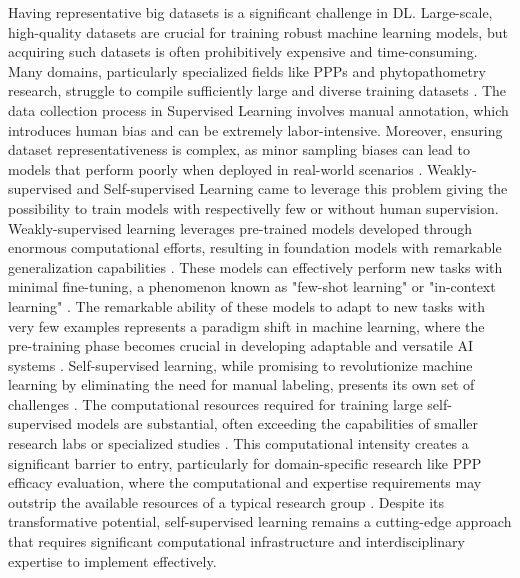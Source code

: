 \documentclass[12pt,a4paper,oneside]{report}
\begin{document}
Having representative big datasets is a significant challenge in DL. 
Large-scale, high-quality datasets are crucial for training robust machine learning models, but acquiring 
such datasets is often prohibitively expensive and time-consuming. Many domains, particularly specialized 
fields like PPPs and phytopathometry research, 
struggle to compile sufficiently large and diverse training datasets 
\cite{alomStateoftheArtSurveyDeep2019}. The data collection process 
in Supervised Learning involves manual annotation, which introduces human bias and can be extremely labor-intensive. 
Moreover, ensuring dataset representativeness is complex, as minor sampling biases can lead to models 
that perform poorly when deployed in real-world scenarios \cite{torralbaUnbiasedLookDataset2011}.
Weakly-supervised and Self-supervised Learning came to leverage this problem giving the possibility
to train models with respectivelly few or without human supervision.
Weakly-supervised learning leverages pre-trained models developed through enormous computational efforts, 
resulting in foundation models with remarkable generalization capabilities \cite{radfordLearningTransferableVisual2021}. 
These models can effectively perform new tasks with minimal fine-tuning, a phenomenon known as 
"few-shot learning" or "in-context learning" \cite{brownLanguageModelsAre2020}. The remarkable ability of 
these models to adapt to new tasks with very few examples represents a paradigm shift in machine 
learning, where the pre-training phase becomes crucial in developing adaptable and versatile 
AI systems \cite{bommasaniOpportunitiesRisksFoundation2022}.
Self-supervised learning, while promising to revolutionize machine learning by eliminating 
the need for manual labeling, presents its own set of challenges \cite{heMomentumContrastUnsupervised2020}. 
The computational resources required for training large self-supervised models are substantial, 
often exceeding the capabilities of smaller research labs or specialized studies \cite{pattersonCarbonEmissionsLarge2021}. 
This computational intensity creates a significant barrier to entry, particularly for domain-specific 
research like PPP efficacy evaluation, where the computational and expertise 
requirements may outstrip the available resources of a typical research group 
\cite{strubellEnergyPolicyConsiderations2019}. Despite its transformative potential, self-supervised learning remains a 
cutting-edge approach that requires significant computational infrastructure and interdisciplinary expertise to implement effectively.
\end{document}
